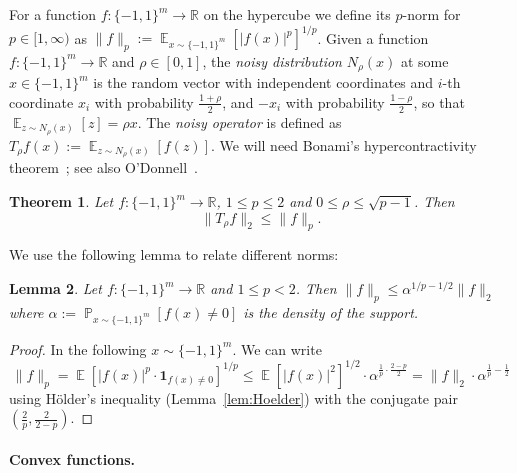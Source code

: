 \documentclass[12pt,english]{article}
\theoremstyle{theorem}
\newtheorem{theorem}{Theorem}
\newtheorem{lemma}[theorem]{Lemma}
\theoremstyle{remark}
\providecommand{\setR}{\mathbb{R}}
\newcommand{\E}{\mathop{\mathbb{E}}}
\renewcommand{\Pr}{\mathop{\mathbb{P}}}
\begin{document}
For a function $f : \{ -1,1\}^m \to \setR$ on the hypercube we define its $p$-norm for $p \in [1,\infty)$
as $\|f\|_p := \E_{x \sim \{ -1,1\}^m}[|f(x)|^p]^{1/p}$.
Given a function $f : \{-1,1\}^m \to \mathbb{R}$ and $\rho \in [0,1]$, the \textit{noisy distribution} $N_\rho (x)$ at some $x \in \{-1,1\}^m$ is the random vector with independent coordinates and $i$-th coordinate $x_i$ with probability $\frac{1+\rho}{2}$, and $-x_i$ with probability $\frac{1-\rho}{2}$, so that $\E_{z \sim N_\rho (x)} [z] = \rho x$. The \textit{noisy operator} is defined as $T_\rho f (x) := \E_{z \sim N_\rho (x)} [f(z)]$. We will need Bonami's hypercontractivity theorem~\cite{Bonami1970}; see also
O'Donnell~\cite[Chapter~10.1]{ODonnell2014}.
\begin{theorem}\label{thm:hypercontractivity}
Let $f:\{-1,1\}^m\to\setR$, $1\le p\le 2$ and $0\le\rho\le\sqrt{ p-1}$. Then \[ \|T_\rho f\|_2 \le \|f\|_p.\]
\end{theorem}
We use the following lemma to relate different norms:
\begin{lemma} \label{lem:fp-vs-f2}
  Let $f : \{ -1,1\}^m \to \setR$ and $1 \leq p < 2$. Then $\|f\|_p \leq \alpha^{1/p-1/2}\|f\|_2$
  where $\alpha := \Pr_{x \sim \{ -1,1\}^m}[f(x) \neq 0]$ is the density of the support.
\end{lemma}
\begin{proof}
  In the following $x \sim \{ -1,1\}^m$.
 We can write
  \[
 \|f\|_p = \E[|f(x)|^p \cdot \bm{1}_{f(x) \neq 0}]^{1/p} \leq \E[|f(x)|^2]^{1/2} \cdot \alpha^{\frac{1}{p} \cdot \frac{2-p}{2}} = \|f\|_2 \cdot \alpha^{\frac{1}{p}-\frac{1}{2}}
\]
using H\"older's inequality (Lemma~\ref{lem:Hoelder}) with the conjugate pair $(\frac{2}{p},\frac{2}{2-p})$.
\end{proof}


\paragraph{Convex functions.}
\end{document}

